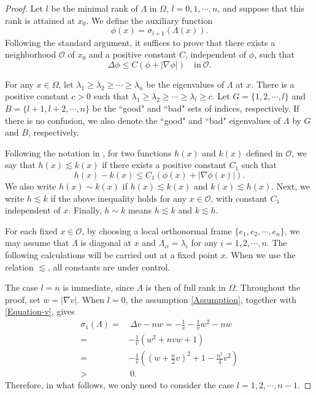 \documentclass[11pt]{amsart}
\numberwithin{theorem}{section}
\numberwithin{equation}{section}
\begin{document}
\begin{proof}
Let $l$ be the minimal rank of $\Lambda$ in $\Omega$, $l=0,1,\cdots,n$, and suppose that this rank is attained at $x_0$. We define the auxiliary function $$\phi(x)=\sigma_{l+1}(\Lambda(x)).$$ Following the standard argument, it suffices to prove that there exists a neighborhood $\mathcal{O}$ of $x_0$ and a positive constant $C$, independent of $\phi$, such that 
\begin{equation}\label{Inequality-Goal}
\Delta\phi\leq C(\phi+|\nabla\phi|)\quad\mathrm{in}\ \mathcal{O}.
\end{equation}

For any $x\in\Omega$, let $\lambda_1\geq\lambda_2\geq\cdots\geq\lambda_n$ be the eigenvalues of $\Lambda$ at $x$. There is a positive constant $c>0$ such that $\lambda_1\geq\lambda_2\geq\cdots\geq\lambda_l\geq c$. Let $G=\{1,2,\cdots,l\}$ and $B=\{l+1,l+2,\cdots,n\}$ be the “good" and “bad" sets of indices, respectively. If there is no confusion, we also denote the “good" and “bad" eigenvalues of $\Lambda$ by $G$ and $B$, respectively.

Following the notation in \cite{Caffarelli-Friedman1985}, for two functions $h(x)$ and $k(x)$ defined in $\mathcal{O}$, we say that $h(x)\lesssim k(x)$ if there exists a positive constant $C_1$ such that $$h(x)-k(x)\leq C_1(\phi(x)+|\nabla\phi(x)|).$$ We also write $h(x)\sim k(x)$ if $h(x)\lesssim k(x)$ and $k(x)\lesssim h(x)$. Next, we write $h\lesssim k$ if the above inequality holds for any $x\in\mathcal{O}$, with constant $C_1$ independent of $x$. Finally, $h\sim k$ means $h\lesssim k$ and $k\lesssim h$.

For each fixed $x\in\mathcal{O}$, by choosing a local orthonormal frame $\{e_1,e_2,\cdots,e_n\}$, we may assume that $\Lambda$ is diagonal at $x$ and $\Lambda_{ii}=\lambda_i$ for any $i=1,2,\cdots,n$. The following calculations will be carried out at a fixed point $x$. When we use the relation $\lesssim$, all constants are under control.

The case $l=n$ is immediate, since $\Lambda$ is then of full rank in $\Omega$. Throughout the proof, set $w=|\nabla v|$. When $l=0$, the assumption \eqref{Assumption},  together with \eqref{Equation-v}, gives
\begin{equation}\label{sigma_1(Lambda)}
\begin{aligned}
\sigma_1(\Lambda)
=&~\Delta v-nw=-\frac{1}{v}-\frac{1}{v}w^2-nw\\
=&-\frac{1}{v}(w^2+nvw+1)\\
=&-\frac{1}{v}\left(\left(w+\frac{n}{2}v\right)^2+1-\frac{n^2}{4}v^2\right)\\
>&~0.
\end{aligned}
\end{equation}
Therefore, in what follows, we only need to consider the case $l=1,2,\cdots,n-1$.


\end{proof}
\end{document}
